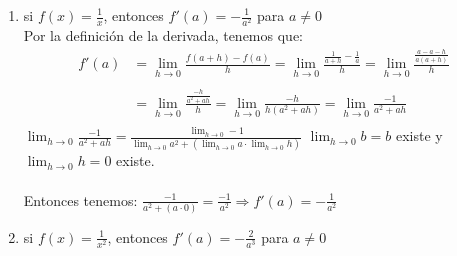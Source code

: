 \documentclass[12pt]{article}
\begin{document}
\begin{enumerate}[\hspace{9px} a)]
    \item si \(f(x)=\displaystyle\frac{1}{x}\), entonces \(f'(a)=-\displaystyle\frac{1}{a^2}\) para \(a \neq 0\)\\

        Por la definición de la derivada, tenemos que:
        \begin{align*}
            f'(a)&=\displaystyle\lim_{h \to 0}\frac{f(a+h)-f(a)}{h}=\displaystyle\lim_{h \to 0}\frac{\displaystyle\frac{1}{a+h}-\frac{1}{a}}{h} = \displaystyle\lim_{h \to 0}\frac{\displaystyle\frac{a-a-h}{a(a+h)}}{h}\\ \\
            &=\displaystyle\lim_{h \to 0}\frac{\displaystyle\frac{-h}{a^2+ah}}{h}=\displaystyle\lim_{h \to 0}\frac{-h}{h(a^2+ah)}=\displaystyle\lim_{h \to 0}\frac{-1}{a^2+ah}\\
        \end{align*}
        \(\displaystyle\lim_{h \to 0}\frac{-1}{a^2+ah} = \frac{\displaystyle\lim_{h \to 0}-1}{\displaystyle\lim_{h \to 0}a^2+(\displaystyle\lim_{h \to 0}a \cdot \displaystyle\lim_{h \to 0}h)}\) \qquad
        \(\displaystyle\lim_{h \to 0}b=b\) existe y \(\displaystyle\lim_{h \to 0}h=0\) existe.\\ \\

        Entonces tenemos: \quad \(\displaystyle\frac{-1}{a^2+(a \cdot 0)}=\frac{-1}{a^2} \Longrightarrow f'(a)=-\frac{1}{a^2}\)\\

    \vfill
    \medskip
    \item si \(f(x)=\displaystyle\frac{1}{x^2}\), entonces \(f'(a)=-\displaystyle\frac{2}{a^3}\) para \(a \neq 0\)\\


\end{enumerate}
\end{document}
